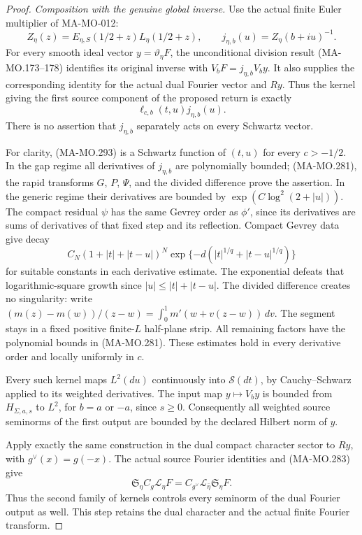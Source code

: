 \begin{proof}
\emph{Composition with the genuine global inverse.}
Use the actual finite Euler multiplier of MA-MO-012:
\[
 Z_\eta(z)=E_{\eta,S}(1/2+z)L_\eta(1/2+z),
       \qquad j_{\eta,b}(u)=Z_\eta(b+iu)^{-1}.
 \tag{MA-MO.292}
\]
For every smooth ideal vector \(y=\vartheta_\eta F\),
the unconditional division result (MA-MO.173--178) identifies
its original inverse with \(V_bF=j_{\eta,b}V_by\).
It also supplies the corresponding identity for the actual
dual Fourier vector and \(Ry\). Thus the kernel giving the
first source component of the proposed return is exactly
\[
                  \ell_{c,b}(t,u)j_{\eta,b}(u).
 \tag{MA-MO.293}
\]
There is no assertion that \(j_{\eta,b}\) separately acts
on every Schwartz vector.

For clarity, (MA-MO.293) is a Schwartz function of \((t,u)\)
for every \(c>-1/2\). In the gap regime all derivatives of
\(j_{\eta,b}\) are polynomially bounded; (MA-MO.281), the
rapid transforms \(G\), \(P\), \(\Psi\), and the divided
difference prove the assertion. In the generic regime their
derivatives are bounded by \(\exp(C\log^2(2+|u|))\).
The compact residual \(\psi\) has the same Gevrey order as
\(\phi'\), since its derivatives are sums of derivatives of
that fixed step and its reflection. Compact Gevrey data give decay
\[
 C_N(1+|t|+|t-u|)^{N}
       \exp\{-d(|t|^{1/q}+|t-u|^{1/q})\}
 \tag{MA-MO.294}
\]
for suitable constants in each derivative estimate. The
exponential defeats that logarithmic-square growth since
\(|u|\le |t|+|t-u|\). The divided difference creates no
singularity: write
\((m(z)-m(w))/(z-w)=\int_0^1m'(w+v(z-w))\,dv\).
The segment stays in a fixed positive finite-\(L\) half-plane
strip. All remaining factors have the polynomial bounds in
(MA-MO.281). These estimates hold in every derivative order
and locally uniformly in \(c\).

Every such kernel maps \(L^2(du)\) continuously into
\(\mathscr S(dt)\), by Cauchy--Schwarz applied to its
weighted derivatives. The input map \(y\mapsto V_by\)
is bounded from \(H_{\Sigma,a,s}\) to \(L^2\), for
\(b=a\) or \(-a\), since \(s\ge0\). Consequently all
weighted source seminorms of the first output are bounded by
the declared Hilbert norm of \(y\).

Apply exactly the same construction in the dual compact
character sector to \(Ry\), with \(g^\vee(x)=g(-x)\).
The actual source Fourier identities and (MA-MO.283) give
\[
 \mathfrak S_\eta C_g\mathcal L_\eta F
       =C_{g^\vee}\mathcal L_{\bar\eta}
                            \mathfrak S_\eta F.
 \tag{MA-MO.295}
\]
Thus the second family of kernels controls every seminorm of
the dual Fourier output as well. This step retains the dual
character and the actual finite Fourier transform.


\end{proof}
